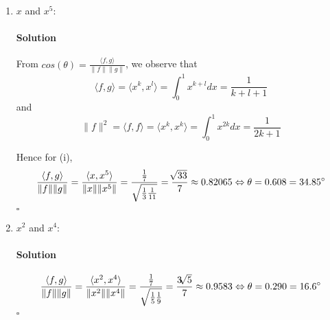 \documentclass[letterpaper,12pt]{article}
\theoremstyle{definition}
\begin{document}
\begin{enumerate}[label=(\roman*)]

\item $x$ and $x^5$:
\paragraph{Solution} From $ cos(\theta) = \frac{\langle f , g \rangle}{\| f \|\| g\|}  $, we observe that 
$$\langle f , g \rangle =  \langle x^k , x^l \rangle = \int_0^1 x^{k + l} dx = \frac{1}{k + l + 1} $$ 
and 
$$ \| f \|^2 =  \langle f , f \rangle = \langle x^k , x^k \rangle =  \int_0^1 x^{2k} dx =  \frac{1}{2k + 1} $$ 

Hence for (i), $$\frac{\langle f , g \rangle}{\| f \|\| g \|} = \frac{\langle x , x^5 \rangle}{\| x \|\| x^5 \|} = \frac{\frac{1}{7}}{\sqrt{\frac{1}{3}\frac{1}{11}}} = \frac{\sqrt[]{33}}{7} \approx 0.82065 \Leftrightarrow \theta = 0.608 =  34.85 \degree $$ $\square$

\item $x^2$ and $x^4$:
\paragraph{Solution} 
$$\frac{\langle f , g \rangle}{\| f \|\| g \|} = \frac{\langle x^2 , x^4 \rangle}{\| x^2 \|\| x^4 \|} = \frac{\frac{1}{7}}{\sqrt{\frac{1}{5}\frac{1}{9}}} = \frac{3\sqrt[]{5}}{7} \approx 0.9583 \Leftrightarrow \theta = 0.290 =  16.6 \degree $$ $\square$

\end{enumerate}
\end{document}
